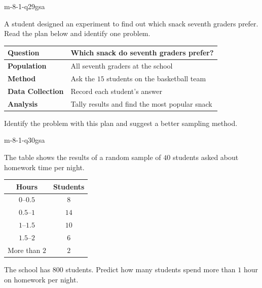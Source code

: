 \begin{practiceQuestion}{m-8-1-q29}{gsa}
\begin{questionText}
A student designed an experiment to find out which snack seventh graders prefer. Read the plan below and identify one problem.

\begin{center}
\begin{tabular}{|l|p{8cm}|}
\hline
\textbf{Question} & Which snack do seventh graders prefer? \\
\hline
\textbf{Population} & All seventh graders at the school \\
\hline
\textbf{Method} & Ask the $15$ students on the basketball team \\
\hline
\textbf{Data Collection} & Record each student's answer \\
\hline
\textbf{Analysis} & Tally results and find the most popular snack \\
\hline
\end{tabular}
\end{center}

Identify the problem with this plan and suggest a better sampling method.
\end{questionText}
\end{practiceQuestion}

\begin{practiceQuestion}{m-8-1-q30}{gsa}
\begin{questionText}
The table shows the results of a random sample of $40$ students asked about homework time per night.

\begin{center}
\begin{tabular}{|c|c|}
\hline
\textbf{Hours} & \textbf{Students} \\
\hline
$0$--$0.5$ & $8$ \\
\hline
$0.5$--$1$ & $14$ \\
\hline
$1$--$1.5$ & $10$ \\
\hline
$1.5$--$2$ & $6$ \\
\hline
More than $2$ & $2$ \\
\hline
\end{tabular}
\end{center}

The school has $800$ students. Predict how many students spend more than $1$ hour on homework per night.
\end{questionText}
\end{practiceQuestion}
